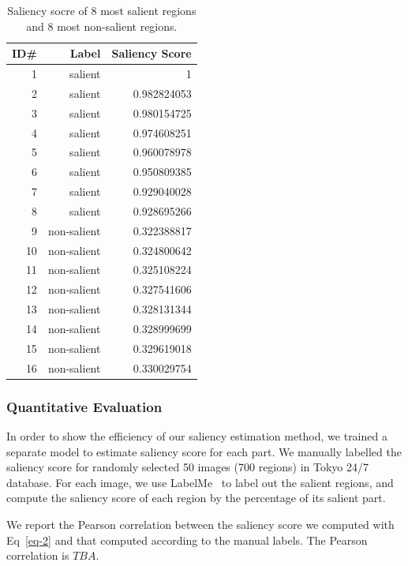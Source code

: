 \begin{table}[htbp]
\begin{tabular}{r|r|r}
ID\# & Label & Saliency Score \\
\hline \hline
1 & salient & 1 \\
2 & salient & 0.982824053 \\
3 & salient & 0.980154725 \\
4 & salient & 0.974608251 \\
5 & salient & 0.960078978 \\
6 & salient & 0.950809385 \\
7 & salient & 0.929040028 \\
8 & salient & 0.928695266 \\
9 & non-salient & 0.322388817 \\
10 & non-salient & 0.324800642 \\
11 & non-salient & 0.325108224 \\
12 & non-salient & 0.327541606 \\
13 & non-salient & 0.328131344 \\
14 & non-salient & 0.328999699 \\
15 & non-salient & 0.329619018 \\
16 & non-salient & 0.330029754
\end{tabular}
\caption{Saliency socre of 8 most salient regions and 8 most non-salient regions.}
\label{table:saliencyscore}
\end{table}

\subsubsection{Quantitative  Evaluation}
\par
In order to show the efficiency of our saliency estimation method, we trained a separate model to estimate saliency score for each part. We manually labelled the saliency score for randomly selected 50 images (700 regions) in Tokyo 24/7 database. For each image, we use LabelMe~\cite{Russell2008} to label out the salient regions, and compute the saliency score of each region by the percentage of its salient part. 
\par
We report the Pearson correlation between the saliency score we computed with Eq~\eqref{eq-2} and that computed according to the manual labels. The Pearson correlation is $TBA$. 





